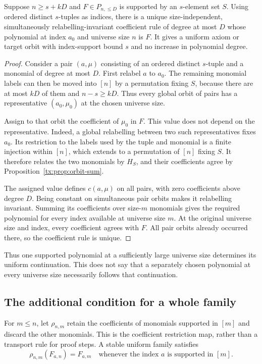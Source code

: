 \begin{proposition}\label{tx:prop:supported-extension}
Suppose $n\ge s+kD$ and $F\in P_{n,\le D}$ is supported by an
$s$-element set $S$. Using ordered distinct $s$-tuples as indices, there
is a unique size-independent, simultaneously relabelling-invariant
coefficient rule of degree at most $D$ whose polynomial at index
$a_0$ and universe size $n$ is $F$. It gives a uniform axiom or target orbit
with index-support bound $s$ and no increase in polynomial degree.
\end{proposition}
\begin{proof}
Consider a pair $(a,\mu)$ consisting of an ordered distinct $s$-tuple
and a monomial of degree at most $D$. First relabel $a$ to $a_0$.
The remaining monomial labels can then be moved into $[n]$ by a
permutation fixing $S$, because there are at most $kD$ of them and
$n-s\ge kD$. Thus every global orbit of pairs has a representative
$(a_0,\mu_0)$ at the chosen universe size.

Assign to that orbit the coefficient of $\mu_0$ in $F$. This value
does not depend on the representative. Indeed, a global relabelling
between two such representatives fixes $a_0$. Its restriction to the
labels used by the tuple and monomial is a finite injection within
$[n]$, which extends to a permutation of $[n]$ fixing $S$. It therefore
relates the two monomials by $H_S$, and their coefficients agree by
Proposition~\ref{tx:prop:orbit-sum}.

The assigned value defines $c(a,\mu)$ on all pairs, with zero
coefficients above degree $D$. Being constant on simultaneous pair
orbits makes it relabelling invariant. Summing its coefficients over
size-$m$ monomials gives the required polynomial for every index
available at universe size $m$. At the original universe size and index, every coefficient
agrees with $F$. All pair orbits already occurred there, so the
coefficient rule is unique.
\end{proof}

Thus one supported polynomial at a sufficiently large universe size determines
its uniform continuation. This does not say that a separately chosen
polynomial at every universe size necessarily follows that continuation.

\subsection{The additional condition for a whole family}
For $m\le n$, let $\rho_{n,m}$ retain the coefficients of monomials
supported in $[m]$ and discard the other monomials. This is the
coefficient restriction map, rather than a transport rule for proof
steps. A stable uniform family satisfies
\begin{equation}\label{tx:eq:coefficient-coherence}
        \rho_{n,m}(F_{a,n})=F_{a,m}
        \quad\text{whenever the index }a\text{ is supported in }[m].
\end{equation}

